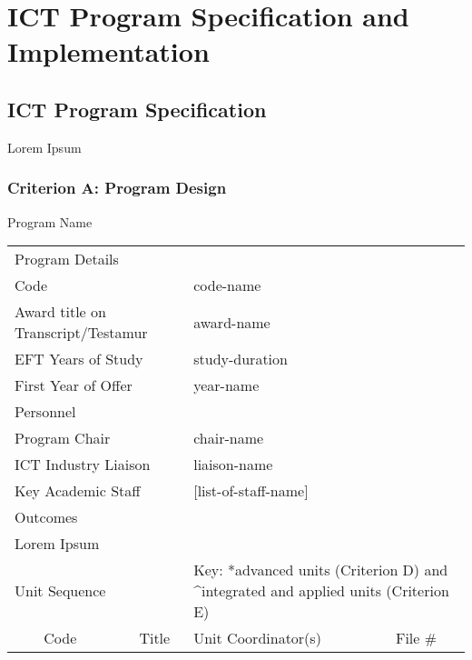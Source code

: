 \documentclass{article}%
\begin{document}
%
\normalsize%
\section{ICT Program Specification and Implementation}%
\label{sec:ICTProgramSpecificationandImplementation}%
\subsection{ICT Program Specification}%
\label{subsec:ICTProgramSpecification}%
Lorem Ipsum%
\subsubsection{Criterion A: Program Design}%
\label{ssubsec:CriterionAProgramDesign}%
Program Name\newline%
%
\begin{adjustbox}{max width=\textwidth}%
\begin{tabular}{|c|c|c|c|c|c|c|c|c|c|c|c|c|c|c|c|c|c|c|c|}%
\hline%
\multicolumn{20}{|l|}{\multirow{2}{*}{\cellcolor{cyan!50}Program Details}}\\%
\multicolumn{20}{|l|}{}\\%
\hline%
\multicolumn{9}{|l|}{Code}&\multicolumn{11}{|l|}{code{-}name}\\%
\hline%
\multicolumn{9}{|l|}{Award title on Transcript/Testamur}&\multicolumn{11}{|l|}{award{-}name}\\%
\hline%
\multicolumn{9}{|l|}{EFT Years of Study}&\multicolumn{11}{|l|}{study{-}duration}\\%
\hline%
\multicolumn{9}{|l|}{First Year of Offer}&\multicolumn{11}{|l|}{year{-}name}\\%
\hline%
\multicolumn{20}{|l|}{\multirow{2}{*}{Personnel}}\\%
\multicolumn{20}{|l|}{}\\%
\hline%
\multicolumn{9}{|l|}{Program Chair}&\multicolumn{11}{|l|}{chair{-}name}\\%
\hline%
\multicolumn{9}{|l|}{ICT Industry Liaison}&\multicolumn{11}{|l|}{liaison{-}name}\\%
\hline%
\multicolumn{9}{|l|}{Key Academic Staff}&\multicolumn{11}{|l|}{{[}list{-}of{-}staff{-}name{]}}\\%
\hline%
\multicolumn{20}{|l|}{\multirow{2}{*}{Outcomes}}\\%
\multicolumn{20}{|l|}{}\\%
\hline%
\multicolumn{20}{|l|}{Lorem Ipsum}\\%
\hline%
\multicolumn{8}{|l}{\multirow{2}{*}{Unit Sequence}}&\multicolumn{12}{l|}{\multirow{2}{*}{Key: *advanced units (Criterion D) and \^{}integrated and applied units (Criterion E)}}\\%
\multicolumn{20}{|l|}{}\\%
\hline%
\multicolumn{1}{|l|}{}&\multicolumn{3}{|l|}{Code}&\multicolumn{8}{|l|}{Title}&\multicolumn{6}{|l|}{Unit Coordinator(s)}&\multicolumn{2}{|l|}{File \#}\\%
\hline%
\end{tabular}%
\end{adjustbox}
\end{document}
